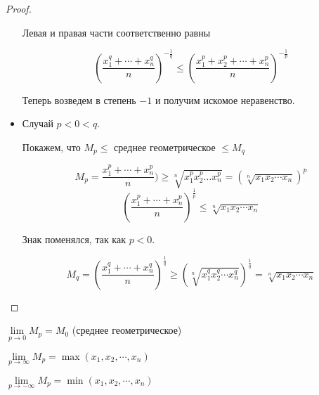 \begin{proof}
\begin{itemize}
        Левая и правая части соответственно равны
    
        \[\left(\frac{x_1^q+\cdots+x_n^q}{n}\right)^{-\frac{1}{q}} \leqslant
        \left(\frac{x_1^p+x_2^p+\cdots+x_n^p}{n}\right)^{-\frac{1}{p}}\]
    
        Теперь возведем в степень $-1$ и получим искомое неравенство.
        \item Случай $p < 0 < q$. 
        
        Покажем, что  $M_p \leqslant $ среднее геометрическое $\leqslant M_q$

        \[M_p = \frac{x_1^p+\cdots + x_n^p}{n}) \geqslant \sqrt[n]{x_1^p x_2^p \dots x_n^p} 
        = (\sqrt[n]{x_1x_2\cdots x_n})^p\]
        \[ (\frac{x_1^p+\cdots + x_n^p}{n})^{\frac{1}{p}} \leqslant \sqrt[n]{x_1x_2\cdots x_n} \]
    
        Знак поменялся, так как $p < 0$.
    
        \[M_q = \left(\frac{x_1^q+\cdots + x_n^q}{n}\right)^\frac{1}{q} \geqslant
        \left(\sqrt[n]{x_1^qx_2^q\cdots x_n^q}\right)^\frac{1}{q} = \sqrt[n]{x_1x_2\cdots x_n}\]
    \end{itemize}
\end{proof}

\begin{theorem-non}
    $\lim\limits_{p \to 0} M_p = M_0$ (среднее геометрическое)
    
    $\lim\limits_{p \to \infty} M_p = \max(x_1, x_2,\cdots, x_n)$

    $\lim\limits_{p \to -\infty} M_p = \min(x_1, x_2, \cdots, x_n)$
\end{theorem-non}